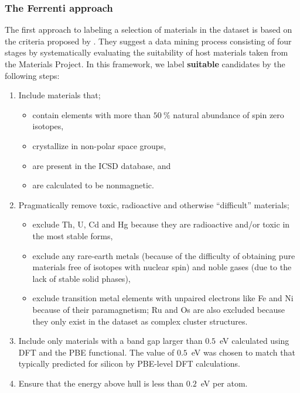 \documentclass[superscriptaddress,unsortedaddress,
 amsmath,amssymb,
 aps,
]{revtex4-2}
\begin{document}
\subsubsection*{The Ferrenti approach}
The first approach to labeling a selection of materials in the dataset is based on the criteria proposed by \citeauthor{Ferrenti2020} \cite{Ferrenti2020}. 
They suggest a data mining process consisting of four stages by systematically evaluating the suitability of host materials taken from the Materials Project. In this framework, we label \textbf{suitable} candidates by the following steps: 
\begin{enumerate}
    \item Include materials that;
    \begin{itemize}
        \item contain elements with more than $50 \ \%$ natural abundance of spin zero isotopes,
        \item crystallize in non-polar space groups,
        \item are present in the ICSD database, 
        and
        \item are calculated to be nonmagnetic. 
    \end{itemize}
    \item Pragmatically remove toxic, radioactive and otherwise ``difficult'' materials;
    \begin{itemize}
        \item exclude Th, U, Cd and Hg because they are radioactive and/or toxic in the most stable forms,
        \item exclude any rare-earth metals (because of the difficulty of obtaining pure materials free of isotopes with nuclear spin) and noble gases (due to the lack of stable solid phases),
        \item exclude transition metal elements with unpaired electrons like Fe and Ni because of their paramagnetism; Ru and Os are also excluded because they only exist in the dataset as complex cluster structures. 
    \end{itemize}
    \item Include only materials with a band gap larger than $0.5$~eV calculated using DFT and the PBE functional. The value of $0.5$~eV was chosen to match that typically predicted for silicon by PBE-level DFT calculations. 
    \item Ensure that the energy above hull is less than $0.2$~eV per atom.
\end{enumerate}
\end{document}
